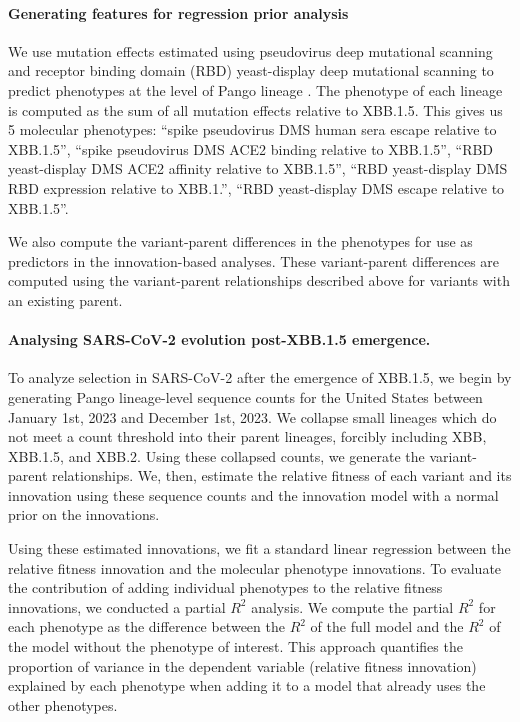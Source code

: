 \paragraph{Generating features for regression prior analysis}%

We use mutation effects estimated using pseudovirus deep mutational scanning and receptor binding domain (RBD) yeast-display deep mutational scanning to predict phenotypes at the level of Pango lineage \cite{Dadonaite2023, Taylor2023}.
The phenotype of each lineage is computed as the sum of all mutation effects relative to XBB.1.5.
This gives us 5 molecular phenotypes: ``spike pseudovirus DMS human sera escape relative to XBB.1.5'', ``spike pseudovirus DMS ACE2 binding relative to XBB.1.5'', ``RBD yeast-display DMS ACE2 affinity relative to XBB.1.5'', ``RBD yeast-display DMS RBD expression relative to XBB.1.'', ``RBD yeast-display DMS escape relative to XBB.1.5''.

We also compute the variant-parent differences in the phenotypes for use as predictors in the innovation-based analyses. 
These variant-parent differences are computed using the variant-parent relationships described above for variants with an existing parent.

\paragraph{Analysing SARS-CoV-2 evolution post-XBB.1.5 emergence.}

To analyze selection in SARS-CoV-2 after the emergence of XBB.1.5, we begin by generating Pango lineage-level sequence counts for the United States between January 1st, 2023 and December 1st, 2023. 
We collapse small lineages which do not meet a count threshold into their parent lineages, forcibly including XBB, XBB.1.5, and XBB.2.
Using these collapsed counts, we generate the variant-parent relationships.
We, then, estimate the relative fitness of each variant and its innovation using these sequence counts and the innovation model with a normal prior on the innovations.

Using these estimated innovations, we fit a standard linear regression between the relative fitness innovation and the molecular phenotype innovations.
To evaluate the contribution of adding individual phenotypes to the relative fitness innovations, we conducted a partial $R^2$ analysis.
We compute the partial $R^2$ for each phenotype as the difference between the $R^2$ of the full model and the $R^2$ of the model without the phenotype of interest.
This approach quantifies the proportion of variance in the dependent variable (relative fitness innovation) explained by each phenotype when adding it to a model that already uses the other phenotypes.

